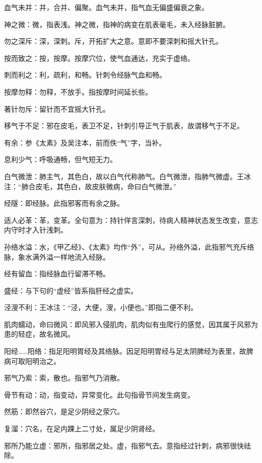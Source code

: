 \documentclass[draft,12pt]{ctexbook}
\begin{document}
\begin{jiaozhu}
  \item 血气未并：并，合并、偏聚。血气未并，指气血无偏盛偏衰之象。
  \item 神之微：微，指表浅。神之微，指神的病变在肌表毫毛，未入经脉脏腑。
  \item 勿之深斥：深，深刺。斥，开拓扩大之意。意即不要深刺和摇大针孔。
  \item 按而致之：按，按摩。按摩穴位，使气血通达，充实于虚络。
  \item 刺而利之：利，疏利，和畅。针刺令经脉气血和畅。
  \item 按摩勿释：勿释，不放手。指按摩时间延长些。
  \item 著针勿斥：留针而不宜摇大针孔。
  \item 移气于不足：邪在皮毛，表卫不足，针刺引导正气于肌表，故谓移气于不足。
  \item 有余：参《太素》及吴注本，前而佚“气”字，当补。
  \item 息利少气：呼吸通畅，但气短无力。
  \item 白气微泄：肺主气，其色白，故以白气代称肺气。白气微泄，指肺气微虚。王冰注：“肺合皮毛，其色白，故皮肤微病，命曰白气微泄。”
  \item 经隧：即经脉。此指邪客而有余之脉。
  \item 适人必革：革，变革。全句意为：持针佯言深刺，待病人精神状态发生改变，意志内守时才入针浅刺。
  \item 孙络水溢：水，《甲乙经》、《太素》均作“外”，可从。孙络外溢，此指邪气充斥络脉，象水满外溢一样地流入经脉。
  \item 经有留血：指经脉血行留滞不畅。
  \item 盛经：与下句的“虚经”皆系指肝经之虚实。
  \item 泾溲不利：王冰注：“泾，大便，溲，小便也。”即指二便不利。
  \item 肌肉蠕动，命曰微风：即风邪入侵肌肉，肌肉似有虫爬行的感觉，因其属于风邪为患的轻症，故名微风。
  \item 阳经……阳络：指足阳明胃经及其络脉。因足阳明胃经与足太阴脾经为表里，故脾病可取阳明治之。
  \item 邪气乃索：索，散也。指邪气乃消散。
  \item 骨节有动：动，指变动，异常变化。此句指骨节间发生病变。
  \item 然筋：即然谷穴，是足少阴经之荥穴。
  \item 复溜：穴名，在足内踝上二寸处，属足少阴肾经。
  \item 邪所乃能立虚：邪所，指邪居之处。虚，指邪气去。意指经过针刺，病邪很快祛除。
\end{jiaozhu}
\end{document}
